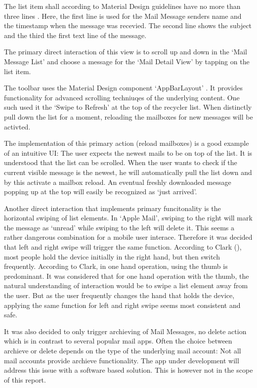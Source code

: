 \documentclass[a4paper,11pt,twoside]{article}
\begin{document}
The list item shall according to Material Design guidelines have no more
than  three lines \cite{material_lists}. Here, the first line is used for the
Mail Message senders name and the timestamp when the message was recevied. The
second line shows the subject and the third the first text line of the message.

The primary direct interaction of this view is to scroll up and down in the
`Mail Message List' and choose a message for the `Mail Detail View' by tapping
on the list item.

The toolbar uses the Material Design component `AppBarLayout'
\cite{appbar_layout}.  It provides functionality for advanced scrolling
techniuqes of the underlying content. One such used it the `Swipe to Refresh' at
the top of the recycler list. When distinctly pull down the list for a moment,
reloading the mailboxes for new messages will be activted.

The implementation of this primary action (reload mailboxes) is a good example
of an intuitive UI: The user expects the newest mails to be on top of the list.
It is understood that the list can be scrolled. When the user wants to check if
the current visible message is the newest, he will automatically pull the list
down and by this activate a mailbox reload. An eventual freshly downloaded
message popping up at the top will easily be recognized as `just arrived'.

Another direct interaction that implements primary funcitonality is the
horizontal swiping of list elements. In `Apple Mail', swiping to the right will
mark the message as `unread' while swiping to the left will delete it. This seems
a rather dangerous combination for a mobile user interace. Therefore it was
decided that left and right swipe will trigger the
same function. According to Clark (\cite[chapter1, `Hold the
phone']{clark2015}), most people hold the device initially in the right hand,
but then switch frequently. According to Clark, in one hand operation, using the
thumb is predominant. It was considered  that for one hand operation with the
thumb, the natural understanding of interaction would be to swipe a list element
away from the user. But as the user frequently changes the hand that holds the
device, applying the same function for left and right swipe seems most
consistent and safe.

It was also decided to only trigger archieving of Mail Messages, no delete
action  which is in contrast to several popular mail apps. Often the choice
between archieve  or delete depends on the type of the underlying mail account:
Not all mail accounts provide archieve functionality. The app under development
will address this issue with a software based solution. This is however not
in the scope of this report.
\end{document}
